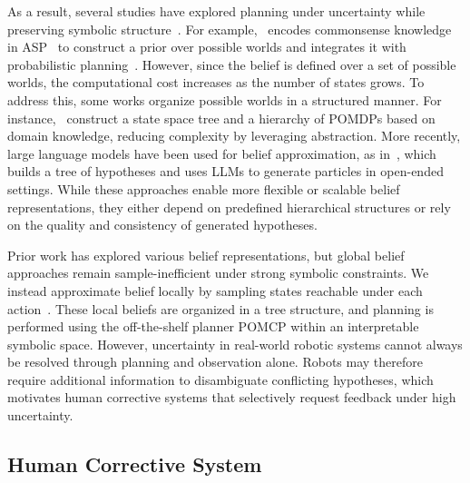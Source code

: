 As a result, several studies have explored planning under uncertainty while preserving symbolic structure~\cite{li2026uncertainty,sanner2010symbolic}. For example,~\cite{zhang2015corpp} encodes commonsense knowledge in ASP~\cite{lifschitz2019answer} to construct a prior over possible worlds and integrates it with probabilistic planning~\cite{kurniawati2008sarsop}. However, since the belief is defined over a set of possible worlds, the computational cost increases as the number of states grows. To address this, some works organize possible worlds in a structured manner. For instance,~\cite{serrano2021knowledge} construct a state space tree and a hierarchy of POMDPs based on domain knowledge, reducing complexity by leveraging abstraction. More recently, large language models have been used for belief approximation, as in~\cite{tang2025tru}, which builds a tree of hypotheses and uses LLMs to generate particles in open-ended settings. While these approaches enable more flexible or scalable belief representations, they either depend on predefined hierarchical structures or rely on the quality and consistency of generated hypotheses.

Prior work has explored various belief representations, but global belief approaches remain sample-inefficient under strong symbolic constraints. We instead approximate belief locally by sampling states reachable under each action~\cite{kurniawati2008sarsop}. These local beliefs are organized in a tree structure, and planning is performed using the off-the-shelf planner POMCP within an interpretable symbolic space. However, uncertainty in real-world robotic systems cannot always be resolved through planning and observation alone. Robots may therefore require additional information to disambiguate conflicting hypotheses, which motivates human corrective systems that selectively request feedback under high uncertainty.


\subsection{Human Corrective System}~\label{rel:HCS}

